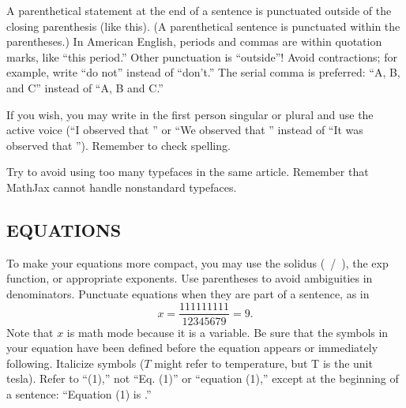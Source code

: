 \documentclass{ieeetj}
\begin{document}
A parenthetical statement at the end of a sentence is punctuated outside of
the closing parenthesis (like this). (A parenthetical sentence is punctuated
within the parentheses.) In American English, periods and commas are within
quotation marks, like ``this period.'' Other punctuation is ``outside''!
Avoid contractions; for example, write ``do not'' instead of ``don't.'' The
serial comma is preferred: ``A, B, and C'' instead of ``A, B and C.''

If you wish, you may write in the first person singular or plural and use
the active voice (``I observed that \textellipsis'' or ``We observed that \textellipsis''
instead of ``It was observed that \textellipsis''). Remember to check spelling.

Try to avoid using too many typefaces in the same article.
Remember that MathJax cannot handle nonstandard typefaces.

\subsection{EQUATIONS}
To make your equations more
compact, you may use the solidus (~/~), the exp function, or appropriate
exponents. Use parentheses to avoid ambiguities in denominators. Punctuate
equations when they are part of a sentence, as in
\begin{equation}
\label{eq1}
x=\frac{111111111}{12345679}=9 .
\end{equation}
Note that $x$ is math mode because it is a variable.
Be sure that the symbols in your equation have been defined before the
equation appears or immediately following. Italicize symbols ($T$ might refer
to temperature, but T is the unit tesla). Refer to ``(1),'' not ``Eq. (1)''
or ``equation (1),'' except at the beginning of a sentence: ``Equation (1)
is \textellipsis .''
\end{document}
